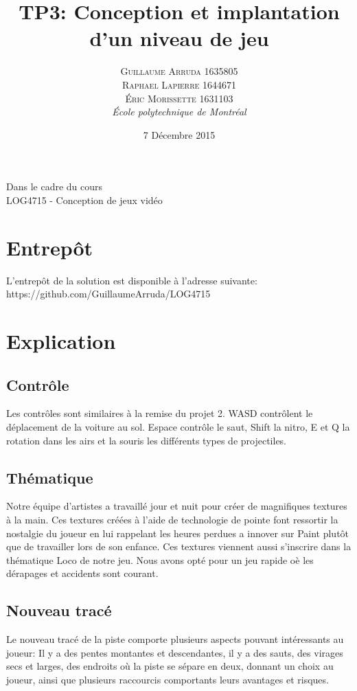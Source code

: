 \documentclass[a4paper, 12pt]{article} %
\title{TP3: Conception et implantation d'un niveau de jeu}
\author{\textsc{Guillaume Arruda 1635805 \\ Raphael Lapierre 1644671 \\ Éric Morissette 1631103} %
\vspace{10pt}
\\{\textit{École polytechnique de Montréal}}} %
\date{7 Décembre 2015} %
\makeatletter
\renewcommand{\maketitle}{ %
\begin{center} %

\vspace*{25pt} %
{\LARGE\@title} %

\vspace{125pt} %

{\large\@author} %

\vspace{125pt} %
Dans le cadre du cours
\\LOG4715 - Conception de jeux vidéo
\vspace{125pt} %
\\\@date %
\vspace{125pt} %

\end{center}
}
\makeatother
\begin{document}
\thispagestyle{empty}
\clearpage\maketitle %
\pagebreak[4]

\setlength{\headheight}{15.0pt}
\pagestyle{fancy}
\fancyhead[C]{}

\section*{Entrepôt}
L'entrepôt de la solution est disponible à l'adresse suivante: https://github.com/GuillaumeArruda/LOG4715

\section*{Explication}
\subsection*{Contrôle}
Les contrôles sont similaires à la remise du projet 2. WASD contrôlent le déplacement de la voiture au sol. Espace contrôle le saut,
Shift la nitro, E et Q la rotation dans les airs et la souris les différents types de projectiles.
\subsection*{Thématique}
Notre équipe d’artistes a travaillé jour et nuit pour créer de magnifiques textures à la main. Ces textures créées à l’aide de technologie de pointe font ressortir la nostalgie du joueur en lui rappelant les heures perdues a innover sur Paint plutôt que de travailler lors de son enfance. Ces textures viennent aussi s’inscrire dans la thématique Loco de notre jeu. Nous avons opté pour un jeu rapide oè les dérapages et accidents sont courant.
\subsection*{Nouveau tracé}
Le nouveau tracé de la piste comporte plusieurs aspects pouvant intéressants au joueur: Il y a des pentes montantes et descendantes, il y a des sauts, des virages secs et larges,	des endroits où la piste se sépare en deux, donnant un choix au joueur, ainsi que plusieurs raccourcis comportants leurs avantages et risques.
\end{document}
